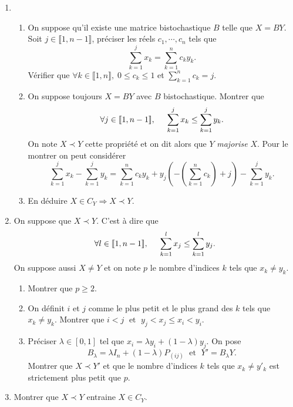 \begin{enumerate}
 \item  
 \begin{enumerate}
   \item On suppose qu'il existe une matrice bistochastique $B$ telle que $X = BY$.\newline
Soit $j \in \llbracket 1,n-1 \rrbracket$, préciser les réels $c_1,\cdots,c_n$ tels que 
\[
 \sum_{k=1}^j x_k = \sum_{k=1}^{n}c_ky_k .
\]
Vérifier que $\forall k \in \llbracket 1,n \rrbracket,\; 0 \leq c_k \leq 1$  et $\sum_{k=1}^{n} c_k = j$.
   \item On suppose toujours $X = BY$ avec $B$ bistochastique. Montrer que   
\[
 \forall j \in \llbracket 1,n-1 \rrbracket, \hspace{0.5cm} \sum_{k=1}^j x_k \leq \sum_{k=1}^j y_k. 
\]
On note $X \prec Y$ cette propriété et on dit alors que $Y$ \emph{majorise} $X$.
Pour le montrer on peut considérer
\[
 \sum_{k=1}^{j}x_k - \sum_{k=1}^{j} y_k =
 \sum_{k=1}^nc_k y_k + y_j\left(-\left( \sum_{k=1}^{n}c_k\right)  + j \right) - \sum_{k=1}^jy_k.
\]

 \item En déduire $X \in C_Y \Rightarrow X \prec Y$.
 \end{enumerate}

 \item On suppose que $X \prec Y$. C'est à dire que 
\[
 \forall l \in \llbracket 1,n-1 \rrbracket, \hspace{0.5cm} \sum_{k=1}^l x_j \leq \sum_{k=1}^l y_j. 
\]
On suppose aussi $X \neq Y$ et on note $p$ le nombre d'indices $k$ tels que $x_k \neq y_k$.
 \begin{enumerate}
  \item Montrer que $p\geq 2$.
  \item On définit $i$ et $j$ comme le plus petit et le plus grand des $k$ tels que $x_k \neq y_k$.\newline
  Montrer que $ i < j \; \text{ et }\; y_j < x_j \leq x_i < y_i$.
  \item Préciser $\lambda \in \left[ 0,1\right]$ tel que $x_i = \lambda y_i + (1-\lambda) y_j$. On pose   
\[
   B_\lambda = \lambda I_n + (1-\lambda) P_{(i j)}\; \text{ et }\; Y' = B_\lambda Y.
\]
Montrer que $X \prec Y'$ et que le nombre d'indices $k$ tels que $x_k \neq y'_k$ est strictement plus petit que $p$.
 \end{enumerate}
 \item Montrer que $X \prec Y$ entraine $X \in C_Y$.
\end{enumerate}
